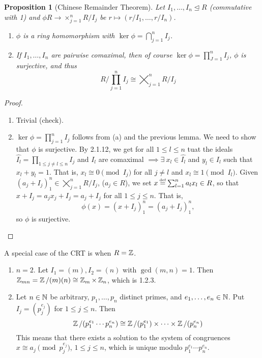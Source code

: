 \documentclass[11pt]{book}
\newcounter{counter}
\newtheorem{proposition}[counter]{Proposition}   \newtheorem{problem}[counter]{Problem}   \newtheorem*{proposition*}{Proposition}   \newtheorem*{lemma*}{Lemma}
\theoremstyle{definition}   \newtheorem{defn}[counter]{Definition} %
\newcommand{\nsg}{\mathrel{\unlhd}}   \newcommand{\ind}{\parindent24pt}   \newcommand{\vn}{\varnothing}
\newcommand\myeq{\mathrel{\overset{\makebox[0pt]{\mbox{\normalfont\tiny\sffamily \textrm{def}}}}{=}}}
\DeclareMathOperator{\ra}{\rightarrow}   \DeclareMathOperator{\Poly}{\mathbf{P}}   \DeclareMathOperator{\spn}{\textnormal{span}}   \DeclareMathOperator{\aut}{\textnormal{Aut}}
\newcommand{\vs}{\vspace{8pt}}
\numberwithin{counter}{chapter}
\begin{document}
\vs

\begin{proposition}[Chinese Remainder Theorem]
Let $I_1, \dots, I_n \nsg R$ (commutative with 1) and $\phi R \ra \times_{j=1}^n R/I_j$ be $r \mapsto (r/I_1, \dots, r/I_n)$.
\begin{enumerate}
\item[(a)] $\phi$ is a ring homomorphism with $\ker \phi = \bigcap_{j=1}^n I_j$.
\item[(b)] If $I_1,\dots,I_n$ are pairwise comaximal, then of course $\ker \phi = \prod_{J=1}^n I_j$, $\phi$ is surjective, and thus
	\[R / \prod_{j=1}^n I_j \cong \bigtimes_{j=1}^n R/I_j \]
\end{enumerate}
\end{proposition}

\begin{proof}\
\begin{enumerate}
\item[(a)] Trivial (check).
\item[(b)] $\ker \phi = \prod_{j=1}^n I_j$ follows from (a) and the previous lemma. We need to show that $\phi$ is surjective. By 2.1.12, we get for all $1 \leq l \leq n$ tuat the ideals $\widehat{I_l} = \prod_{1 \leq j \ne l \leq n} I_j$ and $I_l$ are comaximal $\implies \exists \ x_l \in \widehat{I_l}$ and $y_l \in I_l$ such that $x_l + y_l = 1$. That is, $x_l \cong 0 \pmod{I_j}$ for all $j \ne l$ and $x_l \cong 1 \pmod{I_l}$. Given $(a_j + I_j)_1^n \in \bigtimes_{j=1}^n R/I_j$, ($a_j \in R$), we set $x \myeq \sum_{l=1}^n a_l x_l \in R$, so that $x+I_j = a_jx_j + I_j = a_j + I_j$ for all $1 \leq j \leq n$. That is,
	\[\phi(x) = (x+I_j)_1^n = (a_j + I_j)_1^n, \]
so $\phi$ is surjective.
\end{enumerate}
\end{proof}

\vs

\begin{remark*}
A special case of the CRT is when $R = \operatorname{\mathbb{Z}}$.
\begin{enumerate}
\item[(a)] $n = 2$. Let $I_1 = (m), I_2 = (n)$ with $\gcd(m,n) = 1$. Then $\operatorname{\mathbb{Z}}_{mn} = \operatorname{\mathbb{Z}}/(m)(n) \cong \operatorname{\mathbb{Z}}_m \times \operatorname{\mathbb{Z}}_n$, which is 1.2.3.
\item[(b)] Let $n \in \operatorname{\mathbb{N}}$ be arbitrary, $p_1, \dots, p_n$ distinct primes, and $e_1,\dots,e_n \in \operatorname{\mathbb{N}}$. Put $I_j = (p_j^{e_j})$ for $1 \leq j \leq n$. Then
	\[\operatorname{\mathbb{Z}}/(p_1^{e_1} \cdots p_n^{e_n}) \cong \operatorname{\mathbb{Z}}/(p_1^{e_1}) \times \dots \times \operatorname{\mathbb{Z}}/(p_n^{e_n}) \]
This means that there exists a solution to the system of congruences $x \cong a_j \pmod{p_j^{e_j}}$, $1 \leq j \leq n$, which is unique modulo $p_1^{e_1} \cdots p_n^{e_n}$.
\end{enumerate}
\end{remark*}
\end{document}
